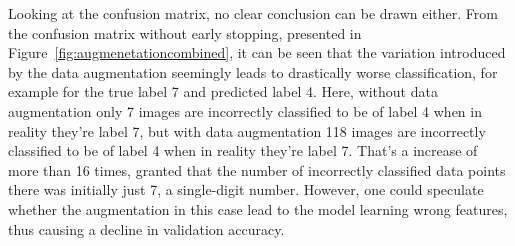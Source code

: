 Looking at the confusion matrix, no clear conclusion can be drawn either. From the confusion matrix without early stopping, presented in Figure~\ref{fig:augmenetationcombined}, it can be seen that the variation introduced by the data augmentation seemingly leads to drastically worse classification, for example for the true label 7 and predicted label 4. Here, without data augmentation only 7 images are incorrectly classified to be of label 4 when in reality they're label 7, but with data augmentation 118 images are incorrectly classified to be of label 4 when in reality they're label 7. That's a increase of more than 16 times, granted that the number of incorrectly classified data points there was initially just 7, a single-digit number. However, one could speculate whether the augmentation in this case lead to the model learning wrong features, thus causing a decline in validation accuracy.

